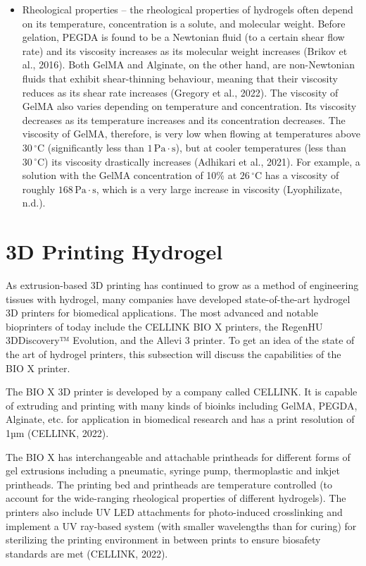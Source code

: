\begin{itemize}
  \item Rheological properties – the rheological properties of hydrogels often depend on its temperature, concentration is a solute, and molecular weight. Before gelation, PEGDA is found to be a Newtonian fluid (to a certain shear flow rate) and its viscosity increases as its molecular weight increases (Brikov et al., 2016). Both GelMA and Alginate, on the other hand, are non-Newtonian fluids that exhibit shear-thinning behaviour, meaning that their viscosity reduces as its shear rate increases (Gregory et al., 2022). The viscosity of GelMA also varies depending on temperature and concentration. Its viscosity decreases as its temperature increases and its concentration decreases. The viscosity of GelMA, therefore, is very low when flowing at temperatures above \(30\,^{\circ}\mathrm{C}\) (significantly less than \(1\,\mathrm{Pa \cdot s}\)), but at cooler temperatures (less than \(30\,^{\circ}\mathrm{C}\)) its viscosity drastically increases (Adhikari et al., 2021). For example, a solution with the GelMA concentration of 10\% at \(26\,^{\circ}\mathrm{C}\) has a viscosity of roughly \(168\,\mathrm{Pa \cdot s}\), which is a very large increase in viscosity (Lyophilizate, n.d.).

\end{itemize}

\section{3D Printing Hydrogel}
As extrusion-based 3D printing has continued to grow as a method of engineering tissues with hydrogel, many companies have developed state-of-the-art hydrogel 3D printers for biomedical applications. The most advanced and notable bioprinters of today include the CELLINK BIO X printers, the RegenHU 3DDiscovery™ Evolution, and the Allevi 3 printer. To get an idea of the state of the art of hydrogel printers, this subsection will discuss the capabilities of the BIO X printer.

The BIO X 3D printer is developed by a company called CELLINK. It is capable of extruding and printing with many kinds of bioinks including GelMA, PEGDA, Alginate, etc. for application in biomedical research and has a print resolution of 1µm (CELLINK, 2022). 

The BIO X has interchangeable and attachable printheads for different forms of gel extrusions including a pneumatic, syringe pump, thermoplastic and inkjet printheads. The printing bed and printheads are temperature controlled (to account for the wide-ranging rheological properties of different hydrogels). The printers also include UV LED attachments for photo-induced crosslinking and implement a UV ray-based system (with smaller wavelengths than for curing) for sterilizing the printing environment in between prints to ensure biosafety standards are met (CELLINK, 2022).
